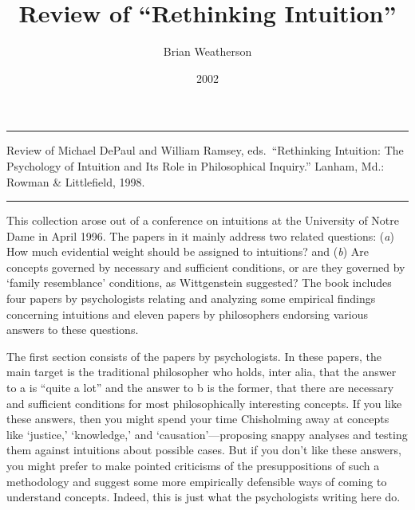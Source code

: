 \documentclass[
  10pt,
  letterpaper,
  DIV=11,
  numbers=noendperiod,
  twoside]{scrartcl}
\title{Review of ``Rethinking Intuition''}
\author{Brian Weatherson}
\date{2002}
\renewenvironment{abstract}
 {\vspace{-1.25cm}
 \quotation\small\noindent\rule{\linewidth}{.5pt}\par\smallskip
 \noindent }
 {\par\noindent\rule{\linewidth}{.5pt}\endquotation}
\begin{document}
\maketitle
\begin{abstract}
Review of Michael DePaul and William Ramsey, eds.~``Rethinking
Intuition: The Psychology of Intuition and Its Role in Philosophical
Inquiry.'' Lanham, Md.: Rowman \& Littlefield, 1998.
\end{abstract}


This collection arose out of a conference on intuitions at the
University of Notre Dame in April 1996. The papers in it mainly address
two related questions: (\emph{a}) How much evidential weight should be
assigned to intuitions? and (\emph{b}) Are concepts governed by
necessary and sufficient conditions, or are they governed by `family
resemblance' conditions, as Wittgenstein suggested? The book includes
four papers by psychologists relating and analyzing some empirical
findings concerning intuitions and eleven papers by philosophers
endorsing various answers to these questions.

The first section consists of the papers by psychologists. In these
papers, the main target is the traditional philosopher who holds, inter
alia, that the answer to a is ``quite a lot'' and the answer to b is the
former, that there are necessary and sufficient conditions for most
philosophically interesting concepts. If you like these answers, then
you might spend your time Chisholming away at concepts like `justice,'
`knowledge,' and `causation'---proposing snappy analyses and testing
them against intuitions about possible cases. But if you don't like
these answers, you might prefer to make pointed criticisms of the
presuppositions of such a methodology and suggest some more empirically
defensible ways of coming to understand concepts. Indeed, this is just
what the psychologists writing here do.
\end{document}
